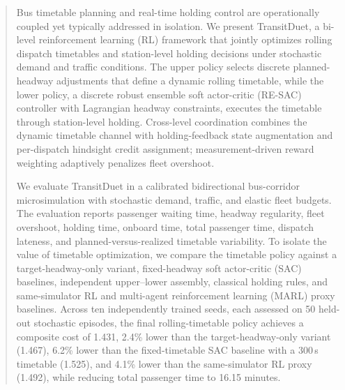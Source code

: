 \begin{abstract}
Bus timetable planning and real-time holding control are operationally coupled yet typically addressed in isolation. We present TransitDuet, a bi-level reinforcement learning (RL) framework that jointly optimizes rolling dispatch timetables and station-level holding decisions under stochastic demand and traffic conditions. The upper policy selects discrete planned-headway adjustments that define a dynamic rolling timetable, while the lower policy, a discrete robust ensemble soft actor-critic (RE-SAC) controller with Lagrangian headway constraints, executes the timetable through station-level holding. Cross-level coordination combines the dynamic timetable channel with holding-feedback state augmentation and per-dispatch hindsight credit assignment; measurement-driven reward weighting adaptively penalizes fleet overshoot.

We evaluate TransitDuet in a calibrated bidirectional bus-corridor microsimulation with stochastic demand, traffic, and elastic fleet budgets. The evaluation reports passenger waiting time, headway regularity, fleet overshoot, holding time, onboard time, total passenger time, dispatch lateness, and planned-versus-realized timetable variability. To isolate the value of timetable optimization, we compare the timetable policy against a target-headway-only variant, fixed-headway soft actor-critic (SAC) baselines, independent upper--lower assembly, classical holding rules, and same-simulator RL and multi-agent reinforcement learning (MARL) proxy baselines. Across ten independently trained seeds, each assessed on 50 held-out stochastic episodes, the final rolling-timetable policy achieves a composite cost of 1.431, 2.4\% lower than the target-headway-only variant (1.467), 6.2\% lower than the fixed-timetable SAC baseline with a 300\,s timetable (1.525), and 4.1\% lower than the same-simulator RL proxy (1.492), while reducing total passenger time to 16.15 minutes.
\end{abstract}
